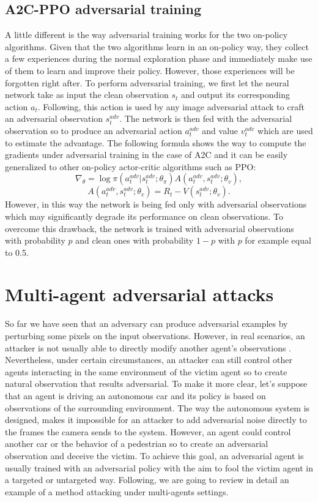 \subsection{A2C-PPO adversarial training}
A little different is the way adversarial training works for the two on-policy algorithms. Given that the two algorithms learn in an on-policy way, they collect a few experiences during the normal exploration phase and immediately make use of them to learn and improve their policy. However, those experiences will be forgotten right after. To perform adversarial training, we first let the neural network take as input the clean observation \(s_t\) and output its corresponding action \(a_t\). Following, this action is used by any image adversarial attack to craft an adversarial observation \(s^{adv}_t\). The network is then fed with the adversarial observation so to produce an adversarial action \(a^{adv}_t\) and value \(v^{adv}_t\) which are used to estimate the advantage. The following formula shows the way to compute the gradients under adversarial training in the case of A2C and it can be easily generalized to other on-policy actor-critic algorithms such as PPO:
\begin{equation} \label{equation:A2C_adv}
\nabla_\theta=\log \pi(a^{adv}_t|s^{adv}_t;\theta_\pi)A(a^{adv}_t,s^{adv}_t;\theta_v),
\end{equation}
\begin{equation}
A(a^{adv}_t,s^{adv}_t;\theta_v)=R_t-V(s^{adv}_t;\theta_v).
\end{equation}
However, in this way the network is being fed only with adversarial observations which may significantly degrade its performance on clean observations. To overcome this drawback, the network is trained with adversarial observations with probability \(p\) and clean ones with probability \(1-p\) with \(p\) for example equal to 0.5.

\section{Multi-agent adversarial attacks}
So far we have seen that an adversary can produce adversarial examples by perturbing some pixels on the input observations. However, in real scenarios, an attacker is not usually able to directly modify another agent’s observations \cite{gleave2020adversarial}. Nevertheless, under certain circumstances, an attacker can still control other agents interacting in the same environment of the victim agent so to create natural observation that results adversarial. To make it more clear, let's suppose that an agent is driving an autonomous car and its policy is based on observations of the surrounding environment. The way the autonomous system is designed, makes it impossible for an attacker to add adversarial noise directly to the frames the camera sends to the system. However, an agent could control another car or the behavior of a pedestrian so to create an adversarial observation and deceive the victim. To achieve this goal, an adversarial agent is usually trained with an adversarial policy with the aim to fool the victim agent in a targeted or untargeted way. Following, we are going to review in detail an example of a method attacking under multi-agents settings.

